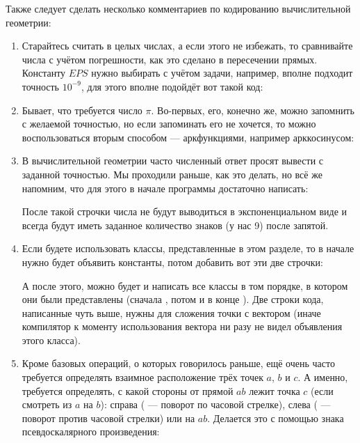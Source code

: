 Также следует сделать несколько комментариев по кодированию вычислительной геометрии:

\begin{enumerate}
    \item Старайтесь считать в целых числах, а если этого не избежать, то сравнивайте числа с учётом погрешности, как это сделано в пересечении прямых. Константу $EPS$ нужно выбирать с учётом задачи, например, вполне подходит точность $10^{-9}$, для этого вполне подойдёт вот такой код:
    
    
    \item Бывает, что требуется число $\pi$. Во-первых, его, конечно же, можно запомнить с желаемой точностью, но если запоминать его не хочется, то можно воспользоваться вторым способом — аркфункциями, например арккосинусом:
    
    
    \item В вычислительной геометрии часто численный ответ просят вывести с заданной точностью. Мы проходили раньше, как это делать, но всё же напомним, что для этого в начале программы достаточно написать:
    
    
    После такой строчки числа не будут выводиться в экспоненциальном виде и всегда будут иметь заданное количество знаков (у нас 9) после запятой.
    
    \item Если будете использовать классы, представленные в этом разделе, то в начале нужно будет объявить константы, потом добавить вот эти две строчки:
    
    
    А после этого, можно будет и написать все классы в том порядке, в котором они были представлены (сначала , потом  и в конце ). Две строки кода, написанные чуть выше, нужны для сложения точки с вектором (иначе компилятор к моменту использования вектора ни разу не видел объявления этого класса).
    
    \item Кроме базовых операций, о которых говорилось раньше, ещё очень часто требуется определять взаимное расположение трёх точек $a$, $b$ и $c$. А именно, требуется определять, с какой стороны от прямой $ab$ лежит точка $c$ (если смотреть из $a$ на $b$): справа ( — поворот по часовой стрелке), слева ( — поворот против часовой стрелки) или на $ab$. Делается это с помощью знака псевдоскалярного произведения:
    
\end{enumerate}
